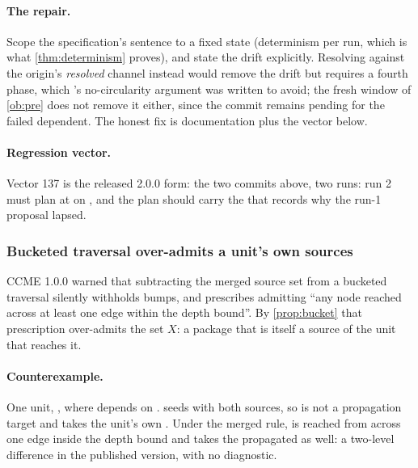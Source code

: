 \paragraph{The repair.} Scope the specification's sentence to a fixed state
(determinism per run, which is what \cref{thm:determinism} proves), and
state the drift explicitly. Resolving  against the origin's
\emph{resolved} channel instead would remove the drift but requires a
fourth phase, which 's no-circularity argument was written to
avoid; the fresh window of \cref{ob:pre} does not remove it either, since
the commit remains pending for the failed dependent. The honest fix is
documentation plus the vector below.

\paragraph{Regression vector.} Vector 137 is the released 2.0.0 form: the two commits above, two runs: run 2 must
plan  at  on \stable{}, and the plan should carry the
 that records why the run-1 proposal lapsed.

\subsubsection{Bucketed traversal over-admits a unit's own sources}

\begin{obligation}
\label{ob:bucket}
CCME 1.0.0  warned that subtracting the merged source set from a bucketed
traversal silently withholds bumps, and prescribes admitting ``any node reached
across at least one edge within the depth bound''. By \cref{prop:bucket} that
prescription over-admits the set $X$: a package that is itself a source of the
unit that reaches it.
\end{obligation}

\paragraph{Counterexample.} One unit, , where
 depends on .  seeds  with both
sources, so  is not a propagation target and takes the unit's own
\bpatch. Under the merged rule,  is reached from  across
one edge inside the depth bound and takes the propagated \bmajor{} as well:
a two-level difference in the published version, with no diagnostic.

